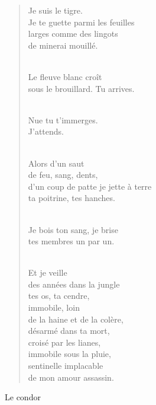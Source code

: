 \documentclass[11pt,a4paper]{book}
\begin{document}
\begin{verse}
Je suis le tigre. \\
Je te guette parmi les feuilles \\
larges comme des lingots \\
de minerai mouillé. \\ \

Le fleuve blanc croît \\
sous le brouillard. Tu arrives. \\ \

Nue tu t'immerges. \\
J'attends. \\ \

Alors d'un saut \\
de feu, sang, dents, \\
d'un coup de patte je jette à terre \\
ta poitrine, tes hanches. \\ \

Je bois ton sang, je brise \\
tes membres un par un. \\ \

Et je veille \\
des années dans la jungle \\
tes os, ta cendre, \\
immobile, loin \\
de la haine et de la colère, \\
désarmé dans ta mort, \\
croisé par les lianes, \\
immobile sous la pluie, \\
sentinelle implacable \\
de mon amour assassin.
\end{verse}

\newpage

{\huge Le condor} \\ \\
\end{document}
